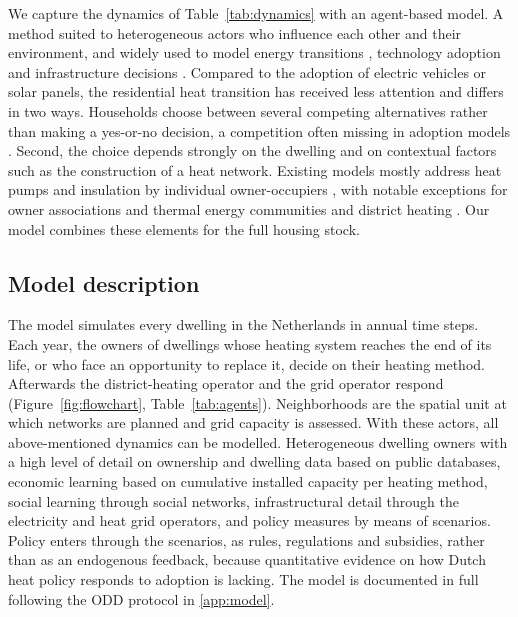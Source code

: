 \documentclass[preprint,12pt,authoryear]{elsarticle}
\begin{document}
We capture the dynamics of Table~\ref{tab:dynamics} with an agent-based
model. A method suited to heterogeneous actors who influence each other and
their environment, and widely used to model energy transitions
\citep{hansenAgentbasedModellingSociotechnical2019b,
liReviewSociotechnicalEnergy2015a}, technology adoption
\citep{mogliaReviewAgentBasedModelling2017,
duModellingEnergyefficientRenovation2022} and infrastructure decisions
\citep{chappinAgentbasedModellingEnergy2010}. Compared to the adoption of
electric vehicles or solar panels, the residential heat transition has
received less attention \citep{hansenAgentbasedModellingSociotechnical2019b}
and differs in two ways. Households choose between several competing
alternatives rather than making a yes-or-no decision, a competition often
missing in adoption models \citep{hesselinkAdoptionEnergyEfficient2019}.
Second, the choice depends strongly on the dwelling and on contextual factors
such as the construction of a heat network. Existing models mostly address
heat pumps and insulation by individual owner-occupiers
\citep{raoCriticalReviewHeat2025}, with notable exceptions for owner
associations and thermal energy communities
\citep{navaguerreroAgentBasedModelingThermal2019,
fouladvandFormationContinuationThermal2020} and district heating
\citep{buschScalingLocalEnergy2017,akhatovaAgentBasedModellingUrban2022}. Our
model combines these elements for the full housing stock.

\subsection{Model description}

The model simulates every dwelling in the Netherlands in annual time steps.
Each year, the owners of dwellings whose heating system reaches the end of
its life, or who face an opportunity to replace it, decide on their heating
method. Afterwards the district-heating operator and the grid operator
respond (Figure~\ref{fig:flowchart}, Table~\ref{tab:agents}). Neighborhoods
are the spatial unit at which networks are planned and grid capacity is
assessed. With these actors, all above-mentioned dynamics can be modelled.
Heterogeneous dwelling owners with a high level of detail on ownership and
dwelling data based on public databases, economic learning based on
cumulative installed capacity per heating method, social learning through
social networks, infrastructural detail through the electricity and heat grid
operators, and policy measures by means of scenarios. Policy enters through
the scenarios, as rules, regulations and subsidies, rather than as an
endogenous feedback, because quantitative evidence on how Dutch heat policy
responds to adoption is lacking. The model is documented in full following
the ODD protocol in \ref{app:model}.
\end{document}
